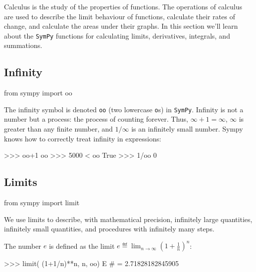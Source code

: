 \label{sec:sympytut_calculus}

Calculus is the study of the properties of functions.
The operations of calculus are used to describe the limit behaviour of functions,
calculate their rates of change,
and calculate the areas under their graphs.
In this section we'll learn about the \texttt{SymPy} functions for calculating
limits, derivatives, integrals, and summations.

\subsection{Infinity}
\label{calculus:infinity}

\small
\begin{verbatimtab}
from sympy import oo
\end{verbatimtab}
\normalsize

\noindent
The infinity symbol is denoted \texttt{oo} (two lowercase \texttt{o}s) in \texttt{SymPy}.						
Infinity is not a number but a process: the process of counting forever.
Thus, $\infty + 1 = \infty$, 
$\infty$ is greater than any finite number,
and $1/\infty$ is an infinitely small number.
Sympy knows how to correctly treat infinity in expressions:

\small
\begin{verbatimtab}
>>> oo+1
oo
>>> 5000 < oo 
True
>>> 1/oo
0
\end{verbatimtab}
\normalsize

\subsection{Limits}
\label{calculus:limits}
\small
\begin{verbatimtab}
from sympy import limit
\end{verbatimtab}
\normalsize

\noindent
We use limits to describe, with mathematical precision, infinitely large quantities,						
infinitely small quantities, and procedures with infinitely many steps.

The number $e$ is defined as the limit
$\displaystyle e \eqdef \lim_{n\to \infty} \left( 1 + \frac{1}{n}\right)^{n}$:
\small
\begin{verbatimtab}
>>> limit( (1+1/n)**n, n, oo)
E          # = 2.71828182845905
\end{verbatimtab}
\normalsize

